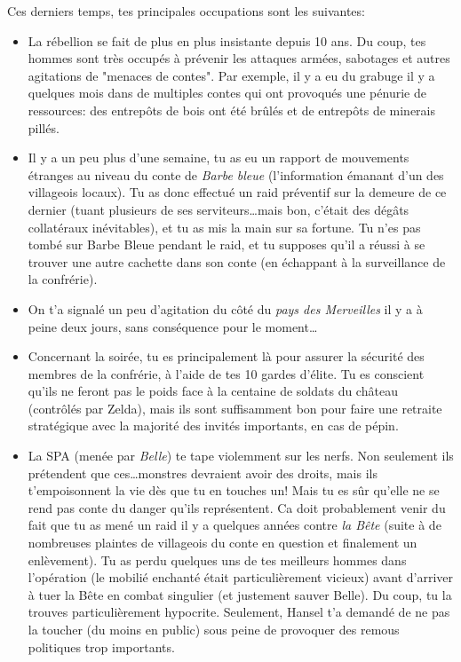 {	Ces derniers temps, tes principales occupations sont les suivantes:
	\begin{itemize}
		\item La rébellion se fait de plus en plus insistante depuis 10 ans. Du coup, tes hommes sont très occupés à prévenir les attaques armées, sabotages et autres agitations de "menaces de contes". Par exemple, il y a eu du grabuge il y a quelques mois dans de multiples contes qui ont provoqués une pénurie de ressources: des entrepôts de bois ont été brûlés et de entrepôts de minerais pillés.
		
		\item Il y a un peu plus d'une semaine, tu as eu un rapport de mouvements étranges au niveau du conte de \emph{Barbe bleue} (l'information émanant d'un des villageois locaux). Tu as donc effectué un raid préventif sur la demeure de ce dernier (tuant plusieurs de ses serviteurs\dots mais bon, c'était des dégâts collatéraux inévitables), et tu as mis la main sur sa fortune. Tu n'es pas tombé sur Barbe Bleue pendant le raid, et tu supposes qu'il a réussi à se trouver une autre cachette dans son conte (en échappant à la surveillance de la confrérie).
		
		\item On t'a signalé un peu d'agitation du côté du \emph{pays des Merveilles} il y a à peine deux jours, sans conséquence pour le moment\dots
		
		\item Concernant la soirée, tu es principalement là pour assurer la sécurité des membres de la confrérie, à l'aide de tes 10 gardes d'élite. Tu es conscient qu'ils ne feront pas le poids face à la centaine de soldats du château (contrôlés par Zelda), mais ils sont suffisamment bon pour faire une retraite stratégique avec la majorité des invités importants, en cas de pépin.
		
		\item La SPA (menée par \emph{Belle}) te tape violemment sur les nerfs. Non seulement ils prétendent que ces\dots monstres devraient avoir des droits, mais ils t'empoisonnent la vie dès que tu en touches un! Mais tu es sûr qu'elle ne se rend pas conte du danger qu'ils représentent. Ca doit probablement venir du fait que tu as mené un raid il y a quelques années contre \emph{la Bête} (suite à de nombreuses plaintes de villageois du conte en question et finalement un enlèvement). Tu as perdu quelques uns de tes meilleurs hommes dans l'opération (le mobilié enchanté était particulièrement vicieux) avant d'arriver à tuer la Bête en combat singulier (et justement sauver Belle). Du coup, tu la trouves particulièrement hypocrite. Seulement, Hansel t'a demandé de ne pas la toucher (du moins en public) sous peine de provoquer des remous politiques trop importants.
	\end{itemize}
}



